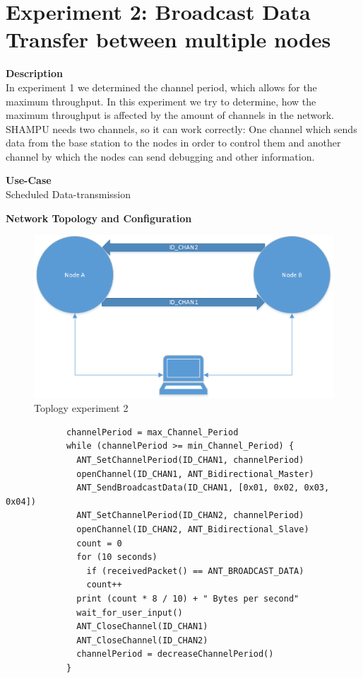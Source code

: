 \section{Experiment 2: Broadcast Data Transfer between multiple nodes}
\begin{description} 
	\item{\textbf{Description}} \hfill \\ In experiment 1 we determined the channel period, which allows for the maximum throughput. In this experiment we try to determine, how the maximum throughput is affected by the amount of channels in the network. SHAMPU needs two channels, so it can work correctly: One channel which sends data from the base station to the nodes in order to control them and another channel by which the nodes can send debugging and other information.
	\item{\textbf{Use-Case}} \hfill \\ Scheduled Data-transmission	
	\item{\textbf{Network Topology and Configuration}} \hfill
		\begin{figure}[H]
			\centering
			\includegraphics[scale=0.6]{./pics/exp2_topo.png}
			\caption{Toplogy experiment 2}
		\end{figure}
		\begin{code}[H]
			\begin{verbatim}
			channelPeriod = max_Channel_Period
			while (channelPeriod >= min_Channel_Period) {
			  ANT_SetChannelPeriod(ID_CHAN1, channelPeriod)
			  openChannel(ID_CHAN1, ANT_Bidirectional_Master)
			  ANT_SendBroadcastData(ID_CHAN1, [0x01, 0x02, 0x03, 0x04])
			  ANT_SetChannelPeriod(ID_CHAN2, channelPeriod)
			  openChannel(ID_CHAN2, ANT_Bidirectional_Slave)
			  count = 0
			  for (10 seconds) 
			    if (receivedPacket() == ANT_BROADCAST_DATA)
			    count++			
			  print (count * 8 / 10) + " Bytes per second"
			  wait_for_user_input()
			  ANT_CloseChannel(ID_CHAN1)
			  ANT_CloseChannel(ID_CHAN2)
			  channelPeriod = decreaseChannelPeriod()
			}
			\end{verbatim}
			\caption{Broadcast data transfer two channels (Master)}\label{lst:mExp2}
		\end{code}
		

\end{description}
